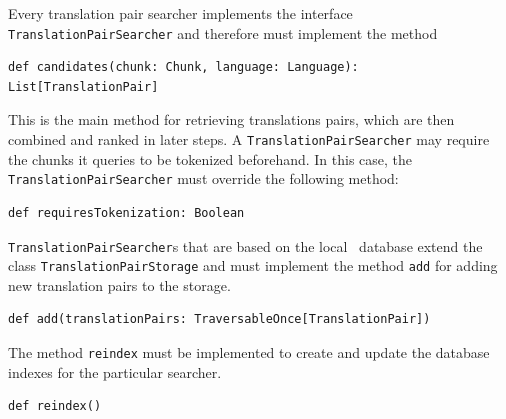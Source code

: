Every translation pair searcher implements the interface {\tt TranslationPairSearcher} and therefore must implement the method 

\vspace*{0.5em}

\begin{lstlisting}
def candidates(chunk: Chunk, language: Language): List[TranslationPair]
\end{lstlisting}

This is the main method for retrieving translations pairs, which are then combined and ranked in later steps. A {\tt TranslationPairSearcher} may require the chunks it queries to be tokenized beforehand. In this case, the {\tt TranslationPairSearcher} must override the following method:

\vspace*{0.5em}

\begin{lstlisting}
def requiresTokenization: Boolean
\end{lstlisting}

\vspace*{0.5em}



{\tt TranslationPairSearcher}s that are based on the local \postgres~database extend the class {\tt TranslationPairStorage} and must implement the method {\tt add} for adding new translation pairs to the storage.

\vspace*{0.5em}

\begin{lstlisting}
def add(translationPairs: TraversableOnce[TranslationPair])
\end{lstlisting}

\vspace*{0.5em}


The method {\tt reindex} must be implemented to create and update the database indexes for the particular searcher.

\begin{lstlisting}
def reindex()
\end{lstlisting}








